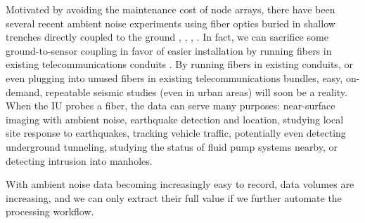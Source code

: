 \documentclass[11pt]{article}
\begin{document}
\par
Motivated by avoiding the maintenance cost of node arrays, there have been several recent ambient noise experiments using fiber optics buried in shallow trenches directly coupled to the ground \cite{AjoFranklin2015}, \cite{Martin2015}, \cite{Martin2016}, \cite{Zeng2017}. In fact, we can sacrifice some ground-to-sensor coupling in favor of easier installation by running fibers in existing telecommunications conduits \cite{Martin2017}. By running fibers in existing conduits, or even plugging into unused fibers in existing telecommunications bundles, easy, on-demand, repeatable seismic studies (even in urban areas) will soon be a reality. When the IU probes a fiber, the data can serve many purposes: near-surface imaging with ambient noise, earthquake detection \cite{Martin2017} and location, studying local site response to earthquakes, tracking vehicle traffic, potentially even detecting underground tunneling, studying the status of fluid pump systems nearby, or detecting intrusion into manholes. 
\par
With ambient noise data becoming increasingly easy to record, data volumes are increasing, and we can only extract their full value if we further automate the processing workflow.

\vspace{-0.5cm}
\end{document}

